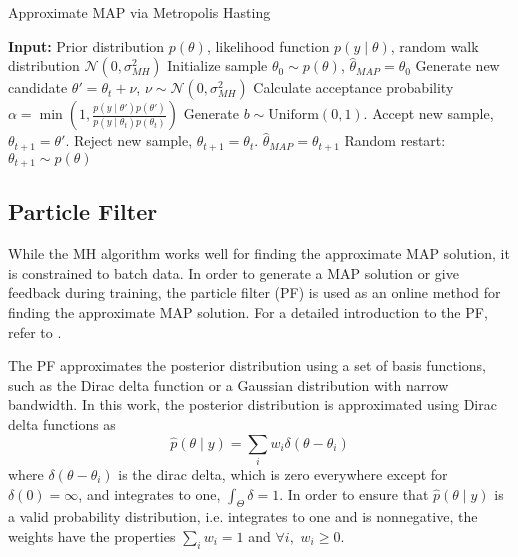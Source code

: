 \begin{algorithm}
\begin{algorithmic}[1]
\caption{Approximate MAP via Metropolis Hasting}
\label{alg:mh}
\STATE \textbf{Input:} Prior distribution $p(\theta)$, likelihood function $p(y \mid \theta)$, random walk distribution $\mathcal{N}(0,\sigma_{MH}^2)$
\STATE Initialize sample $\theta_0 \sim p(\theta)$, $\hat \theta_{MAP} = \theta_0$
\STATE Generate new candidate $\theta' = \theta_{t} + \nu$, $\nu \sim \mathcal{N}(0,\sigma_{MH}^2)$
\STATE Calculate acceptance probability $\alpha = \min\left(1,\frac{p(y \mid \theta' )p(\theta')}{p(y \mid \theta_t )p(\theta_t)}\right)$
\STATE Generate $b \sim \text{Uniform}(0,1)$.
\STATE Accept new sample, $\theta_{t+1} = \theta'$.
\ELSE
\STATE Reject new sample, $\theta_{t+1} = \theta_t$.
\ENDIF
{}
\STATE $\hat \theta_{MAP} = \theta_{t+1}$
\ENDIF
{}
\STATE Random restart: $\theta_{t+1} \sim p(\theta)$ 
\ENDIF
\ENDWHILE
\end{algorithmic}
\end{algorithm}

\subsection{Particle Filter}
While the MH algorithm works well for finding the approximate MAP solution, it is constrained to batch data. In order to generate a MAP solution or give feedback during training, the particle filter (PF) is used as an online method for finding the approximate MAP solution.
For a detailed introduction to the PF, refer to \cite{doucet2009tutorial}.

The PF approximates the posterior distribution using a set of basis functions, such as the Dirac delta function or a Gaussian distribution with narrow bandwidth. In this work, the posterior distribution is approximated using Dirac delta functions as 
\begin{equation}
\hat p(\theta \mid y) = \sum_i w_i \delta(\theta - \theta_i)
\end{equation}
where $\delta(\theta - \theta_i)$ is the dirac delta, which is zero everywhere except for $\delta(0) = \infty$, and integrates to one, $\int_\Theta \delta =1$. In order to ensure that $\hat p (\theta \mid y)$ is a valid probability distribution, i.e. integrates to one and is nonnegative, the weights have the properties $\sum_i w_i  =1$ and $\forall i,$ $w_i \geq 0$.

